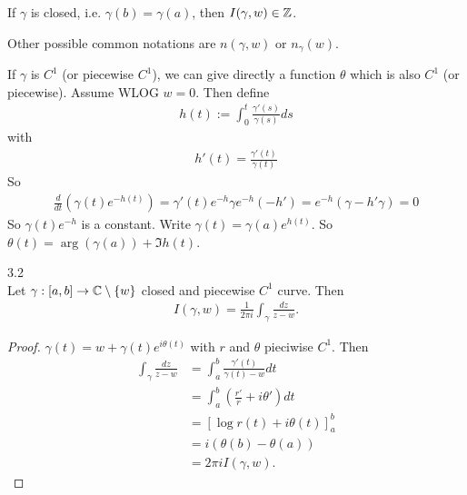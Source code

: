 \documentclass[a4paper]{article}
\begin{document}
If $\gamma$ is closed, i.e. $\gamma(b) = \gamma(a)$, then $I(\gamma,w) \in \mathbb{Z}$.

\begin{rem}
Other possible common notations are $n(\gamma,w)$ or $n_\gamma(w)$.
\end{rem}

If $\gamma$ is $C^1$ (or piecewise $C^1$), we can give directly a function $\theta$ which is also $C^1$ (or piecewise). Assume WLOG $w=0$. Then define
\begin{equation*}
\begin{aligned}
h(t) := \int_0^t \frac{\gamma'(s)}{\gamma(s)} ds
\end{aligned}
\end{equation*}
with
\begin{equation*}
\begin{aligned}
h'(t) = \frac{\gamma'(t)}{\gamma(t)}
\end{aligned}
\end{equation*}
So
\begin{equation*}
\begin{aligned}
\frac{d}{dt} \left(\gamma(t) e^{-h(t)} \right) = \gamma'(t) e^{-h} \gamma e^{-h} (-h') = e^{-h} (\gamma - h'\gamma) = 0
\end{aligned}
\end{equation*}
So $\gamma(t) e^{-h}$ is a constant. Write $\gamma(t) = \gamma(a) e^{h(t)}$. So $\theta(t) = \arg(\gamma(a)) + \Im h(t)$.

\begin{lemma} 3.2\\
Let $\gamma:[a,b] \to \mathbb{C} \setminus \{w\}$ closed and piecewise $C^1$ curve. Then
\begin{equation*}
\begin{aligned}
I(\gamma,w) = \frac{1}{2\pi i}\int_\gamma \frac{dz}{z-w}.
\end{aligned}
\end{equation*}
\begin{proof}
$\gamma(t) = w+\gamma(t) e^{i\theta(t)}$ with $r$ and $\theta$ pieciwise $C^1$. Then
\begin{equation*}
\begin{aligned}
\int_\gamma \frac{dz}{z-w} &= \int_a^b \frac{\gamma'(t)}{\gamma(t)-w} dt \\
&= \int_a^b \left(\frac{r'}{r} + i\theta'\right) dt\\
&= \left[\log r(t) + i\theta(t)\right]_a^b\\
&= i(\theta(b)-\theta(a))\\
&= 2\pi i I(\gamma,w).
\end{aligned}
\end{equation*}
\end{proof}
\end{lemma}
\end{document}
